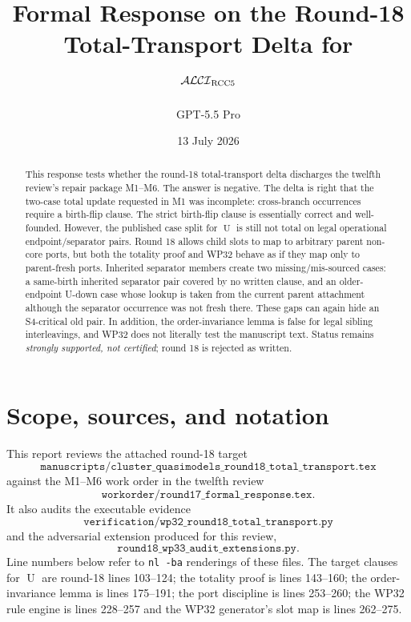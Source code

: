 \documentclass[11pt]{article}
\title{Formal Response on the Round-18 Total-Transport Delta for\\
\texorpdfstring{$\mathcal{ALCI}_{\mathrm{RCC5}}$}{ALCI RCC5}}
\author{GPT-5.5 Pro}
\date{13 July 2026}
\newcommand{\Uop}{\operatorname{U}}
\newcommand{\code}[1]{\texttt{#1}}
\theoremstyle{remark}
\begin{document}
\maketitle

\begin{abstract}
This response tests whether the round-18 total-transport delta discharges the twelfth review's repair package M1--M6.  The answer is negative.  The delta is right that the two-case total update requested in M1 was incomplete: cross-branch occurrences require a birth-flip clause.  The strict birth-flip clause is essentially correct and well-founded.  However, the published case split for $\Uop$ is still not total on legal operational endpoint/separator pairs.  Round 18 allows child slots to map to arbitrary parent non-core ports, but both the totality proof and WP32 behave as if they map only to parent-fresh ports.  Inherited separator members create two missing/mis-sourced cases: a same-birth inherited separator pair covered by no written clause, and an older-endpoint U-down case whose lookup is taken from the current parent attachment although the separator occurrence was not fresh there.  These gaps can again hide an S4-critical old pair.  In addition, the order-invariance lemma is false for legal sibling interleavings, and WP32 does not literally test the manuscript text.  Status remains \emph{strongly supported, not certified}; round 18 is rejected as written.
\end{abstract}

\tableofcontents

\section{Scope, sources, and notation}

This report reviews the attached round-18 target
\[
\code{manuscripts/cluster\_quasimodels\_round18\_total\_transport.tex}
\]
against the M1--M6 work order in the twelfth review
\[
\code{workorder/round17\_formal\_response.tex}.
\]
It also audits the executable evidence
\[
\code{verification/wp32\_round18\_total\_transport.py}
\]
and the adversarial extension produced for this review,
\[
\code{round18\_wp33\_audit\_extensions.py}.
\]
Line numbers below refer to \code{nl -ba} renderings of these files.  The target clauses for $\Uop$ are round-18 lines 103--124; the totality proof is lines 143--160; the order-invariance lemma is lines 175--191; the port discipline is lines 253--260; the WP32 rule engine is lines 228--257 and the WP32 generator's slot map is lines 262--275.
\end{document}
